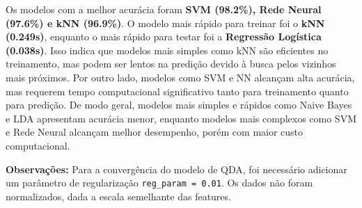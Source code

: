 \begin{table}[H]
    \centering
    \caption{Comparação de acurácia e tempos de execução dos modelos}
    \label{tab:model_comparison}
\end{table}

Os modelos com a melhor acurácia foram \textbf{SVM (98.2\%), Rede Neural (97.6\%) e kNN (96.9\%)}. O modelo mais rápido para treinar foi o \textbf{kNN (0.249s)},
enquanto o mais rápido para testar foi a \textbf{Regressão Logística (0.038s)}. Isso indica que modelos mais simples como kNN são eficientes no treinamento,
mas podem ser lentos na predição devido à busca pelos vizinhos mais próximos. Por outro lado, modelos como SVM e NN alcançam alta acurácia, mas requerem tempo
computacional significativo tanto para treinamento quanto para predição. De modo geral, modelos mais simples e rápidos como Naive Bayes e LDA apresentam acurácia menor,
enquanto modelos mais complexos como SVM e Rede Neural alcançam melhor desempenho, porém com maior custo computacional.

\textbf{Observações:}
Para a convergência do modelo de QDA, foi necessário adicionar um parâmetro de regularização \texttt{reg\_param = 0.01}.
Os dados não foram normalizados, dada a escala semelhante das features.

